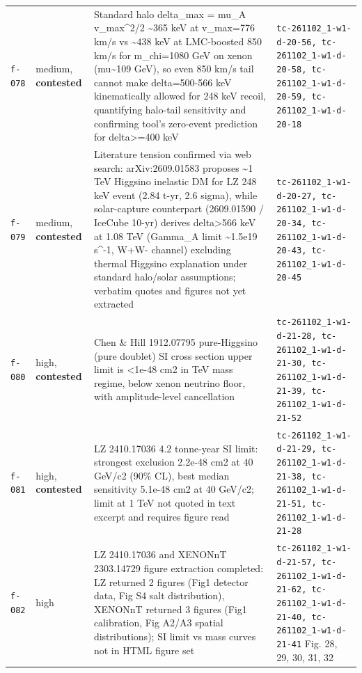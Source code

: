 \documentclass[11pt,a4paper]{article}
\begin{document}
\begin{longtable}{@{}p{}p{}p{}p{}@{}}
\texttt{f-078} & medium, \textbf{contested} & Standard halo delta\_max = mu\_A v\_max\textasciicircum{}2/2 \textasciitilde{}365 keV at v\_max=776 km/s vs \textasciitilde{}438 keV at LMC-boosted 850 km/s for m\_chi=1080 GeV on xenon (mu\textasciitilde{}109 GeV), so even 850 km/s tail cannot make delta=500-566 keV kinematically allowed for 248 keV recoil, quantifying halo-tail sensitivity and confirming tool's zero-event prediction for delta\textgreater{}=400 keV & \texttt{tc-261102\_\allowbreak{}1-w1-d-20-56,\allowbreak{} tc-261102\_\allowbreak{}1-w1-d-20-58,\allowbreak{} tc-261102\_\allowbreak{}1-w1-d-20-59,\allowbreak{} tc-261102\_\allowbreak{}1-w1-d-20-18} \\
\texttt{f-079} & medium, \textbf{contested} & Literature tension confirmed via web search: arXiv:2609.01583 proposes \textasciitilde{}1 TeV Higgsino inelastic DM for LZ 248 keV event (2.84 t-yr, 2.6 sigma), while solar-capture counterpart (2609.01590 / IceCube 10-yr) derives delta\textgreater{}566 keV at 1.08 TeV (Gamma\_A limit \textasciitilde{}1.5e19 s\textasciicircum{}-1, W+W- channel) excluding thermal Higgsino explanation under standard halo/solar assumptions; verbatim quotes and figures not yet extracted & \texttt{tc-261102\_\allowbreak{}1-w1-d-20-27,\allowbreak{} tc-261102\_\allowbreak{}1-w1-d-20-34,\allowbreak{} tc-261102\_\allowbreak{}1-w1-d-20-43,\allowbreak{} tc-261102\_\allowbreak{}1-w1-d-20-45} \\
\texttt{f-080} & high, \textbf{contested} & Chen \& Hill 1912.07795 pure-Higgsino (pure doublet) SI cross section upper limit is \textless{}1e-48 cm2 in TeV mass regime, below xenon neutrino floor, with amplitude-level cancellation & \texttt{tc-261102\_\allowbreak{}1-w1-d-21-28,\allowbreak{} tc-261102\_\allowbreak{}1-w1-d-21-30,\allowbreak{} tc-261102\_\allowbreak{}1-w1-d-21-39,\allowbreak{} tc-261102\_\allowbreak{}1-w1-d-21-52} \\
\texttt{f-081} & high, \textbf{contested} & LZ 2410.17036 4.2 tonne-year SI limit: strongest exclusion 2.2e-48 cm2 at 40 GeV/c2 (90\% CL), best median sensitivity 5.1e-48 cm2 at 40 GeV/c2; limit at 1 TeV not quoted in text excerpt and requires figure read & \texttt{tc-261102\_\allowbreak{}1-w1-d-21-29,\allowbreak{} tc-261102\_\allowbreak{}1-w1-d-21-38,\allowbreak{} tc-261102\_\allowbreak{}1-w1-d-21-51,\allowbreak{} tc-261102\_\allowbreak{}1-w1-d-21-28} \\
\texttt{f-082} & high & LZ 2410.17036 and XENONnT 2303.14729 figure extraction completed: LZ returned 2 figures (Fig1 detector data, Fig S4 salt distribution), XENONnT returned 3 figures (Fig1 calibration, Fig A2/A3 spatial distributions); SI limit vs mass curves not in HTML figure set & \texttt{tc-261102\_\allowbreak{}1-w1-d-21-57,\allowbreak{} tc-261102\_\allowbreak{}1-w1-d-21-62,\allowbreak{} tc-261102\_\allowbreak{}1-w1-d-21-40,\allowbreak{} tc-261102\_\allowbreak{}1-w1-d-21-41} Fig. 28, 29, 30, 31, 32 \\

\end{longtable}
\end{document}
